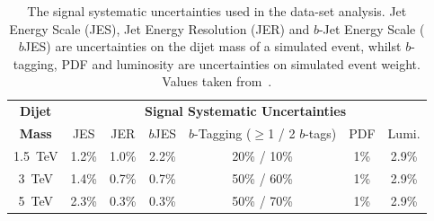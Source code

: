 \begin{table}[!htb]
  \centering
  \begin{tabular}{|c||c|c|c|c|c|c|}
    \hline
    \textbf{Dijet}   & \multicolumn{6}{c|}{\textbf{Signal Systematic Uncertainties}}                             \\ \cline{2-7} 
    \textbf{Mass}    & JES   & JER   & $b$JES  & $b$-Tagging ($\geq$1 / 2 $b$-tags) & PDF & Lumi.       \\
    \hline                                                                        
    1.5~TeV          & 1.2\% & 1.0\% & 2.2\%   &        20\% / 10\%                 & 1\% & 2.9\%       \\
    3~TeV            & 1.4\% & 0.7\% & 0.7\%   &        50\% / 60\%                 & 1\% & 2.9\%       \\
    5~TeV            & 2.3\% & 0.3\% & 0.3\%   &        50\% / 70\%                 & 1\% & 2.9\%       \\
    \hline
  \end{tabular}
\caption[The signal systematic uncertainties used in the \summer{} data-set analysis.]
        {The signal systematic uncertainties used in the \summer{} data-set analysis.
          Jet Energy Scale (JES), Jet Energy Resolution (JER) and $b$-Jet Energy Scale ($b$JES)
          are uncertainties on the dijet mass of a simulated event,
          whilst $b$-tagging, PDF and luminosity are uncertainties on simulated event weight.
          Values taken from~\cite{dibjet-ichep_conf}.}
  \label{tab:lim-summer_syst}
  \end{table}

